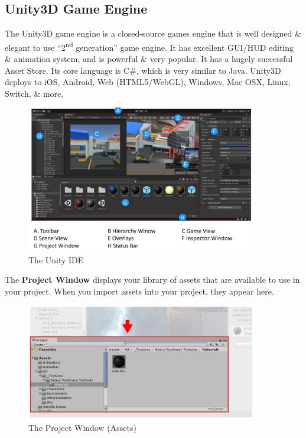 \documentclass[a4paper,11pt]{article}
\begin{document}
\subsection{Unity3D Game Engine}
The Unity3D game engine is a closed-source games engine that is well designed \& elegant to use ``2\textsuperscript{nd}
generation'' game engine. 
It has excellent GUI/HUD editing \& animation system, and is powerful \& very popular. 
It has a hugely successful Asset Store. 
Its core language is C\#, which is very similar to Java. 
Unity3D deploys to iOS, Android, Web (HTML5/WebGL), Windows, Mac OSX, Linux, Switch, \& more.
\begin{figure}[H]
    \centering
    \includegraphics[width=0.9\textwidth]{./images/unity_ide.png}
    \caption{The Unity IDE}
\end{figure}

The \textbf{Project Window} displays your library of assets that are available to use in your project. 
When you import assets into your project, they appear here.
\begin{figure}[H]
    \centering
    \includegraphics[width=0.9\textwidth]{./images/project_window.png}
    \caption{The Project Window (Assets)}
\end{figure}
\end{document}
